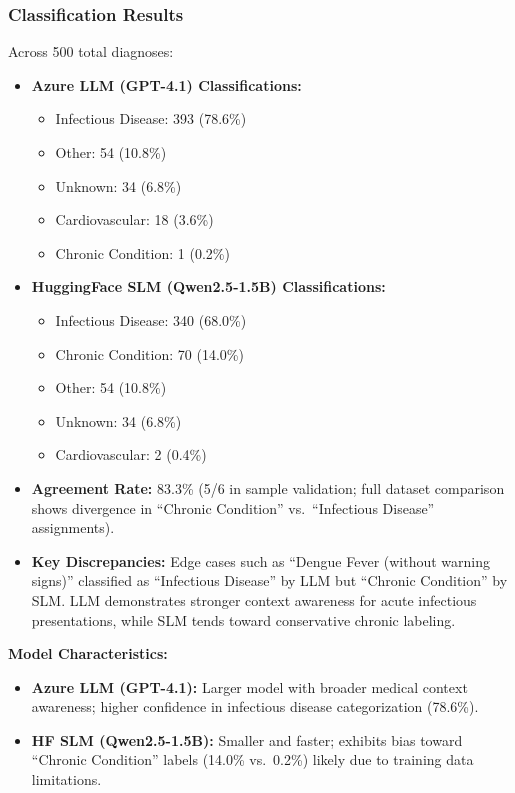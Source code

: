 \documentclass[10pt,a4paper]{article}
\begin{document}
\subsubsection{Classification Results}

Across 500 total diagnoses:

\begin{itemize}
    \item \textbf{Azure LLM (GPT-4.1) Classifications:} 
    \begin{itemize}
        \item Infectious Disease: 393 (78.6\%)
        \item Other: 54 (10.8\%)
        \item Unknown: 34 (6.8\%)
        \item Cardiovascular: 18 (3.6\%)
        \item Chronic Condition: 1 (0.2\%)
    \end{itemize}
    
    \item \textbf{HuggingFace SLM (Qwen2.5-1.5B) Classifications:}
    \begin{itemize}
        \item Infectious Disease: 340 (68.0\%)
        \item Chronic Condition: 70 (14.0\%)
        \item Other: 54 (10.8\%)
        \item Unknown: 34 (6.8\%)
        \item Cardiovascular: 2 (0.4\%)
    \end{itemize}
    
    \item \textbf{Agreement Rate:} 83.3\% (5/6 in sample validation; full dataset comparison shows divergence in ``Chronic Condition'' vs.~``Infectious Disease'' assignments).
    
    \item \textbf{Key Discrepancies:} Edge cases such as ``Dengue Fever (without warning signs)'' classified as ``Infectious Disease'' by LLM but ``Chronic Condition'' by SLM. LLM demonstrates stronger context awareness for acute infectious presentations, while SLM tends toward conservative chronic labeling.
\end{itemize}

\vspace{0.2cm}
\noindent\textbf{Model Characteristics:}
\begin{itemize}[nosep]
    \item \textbf{Azure LLM (GPT-4.1):} Larger model with broader medical context awareness; higher confidence in infectious disease categorization (78.6\%).
    \item \textbf{HF SLM (Qwen2.5-1.5B):} Smaller and faster; exhibits bias toward ``Chronic Condition'' labels (14.0\% vs.~0.2\%) likely due to training data limitations.
\end{itemize}
\end{document}
